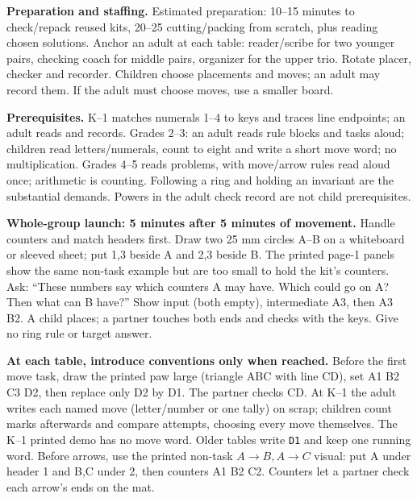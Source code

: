 \documentclass[10pt]{article}
\newcommand{\word}[1]{\texttt{#1}}
\begin{document}
\textbf{Preparation and staffing.} Estimated preparation: 10--15 minutes to check/repack reused kits, 20--25 cutting/packing from scratch, plus reading chosen solutions. Anchor an adult at each table: reader/scribe for two younger pairs, checking coach for middle pairs, organizer for the upper trio. Rotate placer, checker and recorder. Children choose placements and moves; an adult may record them. If the adult must choose moves, use a smaller board.

\textbf{Prerequisites.} K--1 matches numerals 1--4 to keys and traces line endpoints; an adult reads and records. Grades 2--3: an adult reads rule blocks and tasks aloud; children read letters/numerals, count to eight and write a short move word; no multiplication. Grades 4--5 reads problems, with move/arrow rules read aloud once; arithmetic is counting. Following a ring and holding an invariant are the substantial demands. Powers in the adult check record are not child prerequisites.

\textbf{Whole-group launch: 5 minutes after 5 minutes of movement.} Handle counters and match headers first. Draw two 25 mm circles A--B on a whiteboard or sleeved sheet; put 1,3 beside A and 2,3 beside B. The printed page-1 panels show the same non-task example but are too small to hold the kit's counters. Ask: ``These numbers say which counters A may have. Which could go on A? Then what can B have?'' Show input (both empty), intermediate A3, then A3 B2. A child places; a partner touches both ends and checks with the keys. Give no ring rule or target answer.

\textbf{At each table, introduce conventions only when reached.} Before the first move task, draw the printed paw large (triangle ABC with line CD), set A1 B2 C3 D2, then replace only D2 by D1. The partner checks CD. At K--1 the adult writes each named move (letter/number or one tally) on scrap; children count marks afterwards and compare attempts, choosing every move themselves. The K--1 printed demo has no move word. Older tables write \word{D1} and keep one running word. Before arrows, use the printed non-task $A\to B,A\to C$ visual: put A under header 1 and B,C under 2, then counters A1 B2 C2. Counters let a partner check each arrow's ends on the mat.
\end{document}

